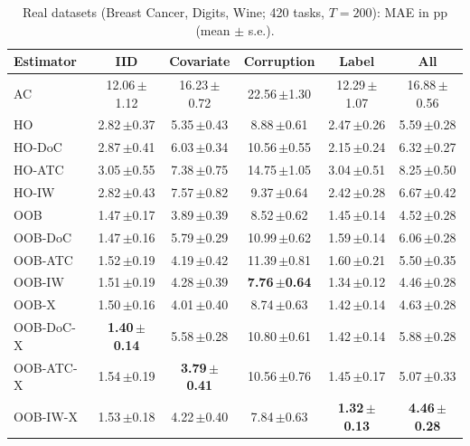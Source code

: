\begin{table}[t]
\centering\small
\caption{Real datasets (Breast Cancer, Digits, Wine; 420 tasks, $T=200$): MAE in pp (mean $\pm$ s.e.).}
\label{tab:real}
\begin{tabular}{lccccc}
\toprule
Estimator & IID & Covariate & Corruption & Label & All\\
\midrule
AC & 12.06\,\scriptsize{$\pm$1.12} & 16.23\,\scriptsize{$\pm$0.72} & 22.56\,\scriptsize{$\pm$1.30} & 12.29\,\scriptsize{$\pm$1.07} & 16.88\,\scriptsize{$\pm$0.56} \\
HO & 2.82\,\scriptsize{$\pm$0.37} & 5.35\,\scriptsize{$\pm$0.43} & 8.88\,\scriptsize{$\pm$0.61} & 2.47\,\scriptsize{$\pm$0.26} & 5.59\,\scriptsize{$\pm$0.28} \\
HO\mbox{-}DoC & 2.87\,\scriptsize{$\pm$0.41} & 6.03\,\scriptsize{$\pm$0.34} & 10.56\,\scriptsize{$\pm$0.55} & 2.15\,\scriptsize{$\pm$0.24} & 6.32\,\scriptsize{$\pm$0.27} \\
HO\mbox{-}ATC & 3.05\,\scriptsize{$\pm$0.55} & 7.38\,\scriptsize{$\pm$0.75} & 14.75\,\scriptsize{$\pm$1.05} & 3.04\,\scriptsize{$\pm$0.51} & 8.25\,\scriptsize{$\pm$0.50} \\
HO\mbox{-}IW & 2.82\,\scriptsize{$\pm$0.43} & 7.57\,\scriptsize{$\pm$0.82} & 9.37\,\scriptsize{$\pm$0.64} & 2.42\,\scriptsize{$\pm$0.28} & 6.67\,\scriptsize{$\pm$0.42} \\
OOB & 1.47\,\scriptsize{$\pm$0.17} & 3.89\,\scriptsize{$\pm$0.39} & 8.52\,\scriptsize{$\pm$0.62} & 1.45\,\scriptsize{$\pm$0.14} & 4.52\,\scriptsize{$\pm$0.28} \\
OOB\mbox{-}DoC & 1.47\,\scriptsize{$\pm$0.16} & 5.79\,\scriptsize{$\pm$0.29} & 10.99\,\scriptsize{$\pm$0.62} & 1.59\,\scriptsize{$\pm$0.14} & 6.06\,\scriptsize{$\pm$0.28} \\
OOB\mbox{-}ATC & 1.52\,\scriptsize{$\pm$0.19} & 4.19\,\scriptsize{$\pm$0.42} & 11.39\,\scriptsize{$\pm$0.81} & 1.60\,\scriptsize{$\pm$0.21} & 5.50\,\scriptsize{$\pm$0.35} \\
OOB\mbox{-}IW & 1.51\,\scriptsize{$\pm$0.19} & 4.28\,\scriptsize{$\pm$0.39} & \textbf{7.76\,\scriptsize{$\pm$0.64}} & 1.34\,\scriptsize{$\pm$0.12} & 4.46\,\scriptsize{$\pm$0.28} \\
OOB\mbox{-}X & 1.50\,\scriptsize{$\pm$0.16} & 4.01\,\scriptsize{$\pm$0.40} & 8.74\,\scriptsize{$\pm$0.63} & 1.42\,\scriptsize{$\pm$0.14} & 4.63\,\scriptsize{$\pm$0.28} \\
OOB\mbox{-}DoC\mbox{-}X & \textbf{1.40\,\scriptsize{$\pm$0.14}} & 5.58\,\scriptsize{$\pm$0.28} & 10.80\,\scriptsize{$\pm$0.61} & 1.42\,\scriptsize{$\pm$0.14} & 5.88\,\scriptsize{$\pm$0.28} \\
OOB\mbox{-}ATC\mbox{-}X & 1.54\,\scriptsize{$\pm$0.19} & \textbf{3.79\,\scriptsize{$\pm$0.41}} & 10.56\,\scriptsize{$\pm$0.76} & 1.45\,\scriptsize{$\pm$0.17} & 5.07\,\scriptsize{$\pm$0.33} \\
OOB\mbox{-}IW\mbox{-}X & 1.53\,\scriptsize{$\pm$0.18} & 4.22\,\scriptsize{$\pm$0.40} & 7.84\,\scriptsize{$\pm$0.63} & \textbf{1.32\,\scriptsize{$\pm$0.13}} & \textbf{4.46\,\scriptsize{$\pm$0.28}} \\
\bottomrule
\end{tabular}
\end{table}

